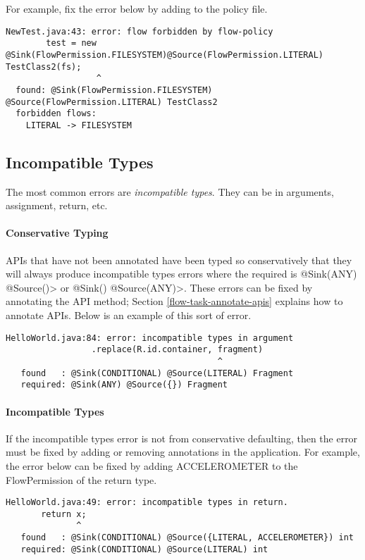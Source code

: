For example, fix the error below by adding  to the policy file.
\begin{Verbatim}
NewTest.java:43: error: flow forbidden by flow-policy  
        test = new @Sink(FlowPermission.FILESYSTEM)@Source(FlowPermission.LITERAL) TestClass2(fs);
                  ^
  found: @Sink(FlowPermission.FILESYSTEM) @Source(FlowPermission.LITERAL) TestClass2 
  forbidden flows:
    LITERAL -> FILESYSTEM
\end{Verbatim}

\subsection{Incompatible Types}
The most common errors are \emph{incompatible types}.  They can be in arguments,  assignment, return, etc.

\paragraph{Conservative Typing}

APIs that have not been annotated have been typed so conservatively that they will always produce incompatible types errors where the required is \<@Sink(ANY) @Source({})> or 
\<@Sink({}) @Source(ANY)>.  These errors can be fixed by annotating the API method; 
Section \ref{flow-task-annotate-apis} explains how to annotate APIs. 
Below is an example of this sort of error.

\begin{Verbatim}
HelloWorld.java:84: error: incompatible types in argument
                 .replace(R.id.container, fragment)
                                          ^
   found   : @Sink(CONDITIONAL) @Source(LITERAL) Fragment
   required: @Sink(ANY) @Source({}) Fragment
\end{Verbatim}

\paragraph{Incompatible Types}

If the incompatible types error is not from conservative defaulting, then the error must be fixed by adding or
removing annotations in the application.  For example, the error below can be fixed by adding ACCELEROMETER to the FlowPermission of the return type.  

\begin{Verbatim}
HelloWorld.java:49: error: incompatible types in return.
       return x;
              ^
   found   : @Sink(CONDITIONAL) @Source({LITERAL, ACCELEROMETER}) int
   required: @Sink(CONDITIONAL) @Source(LITERAL) int
\end{Verbatim}

